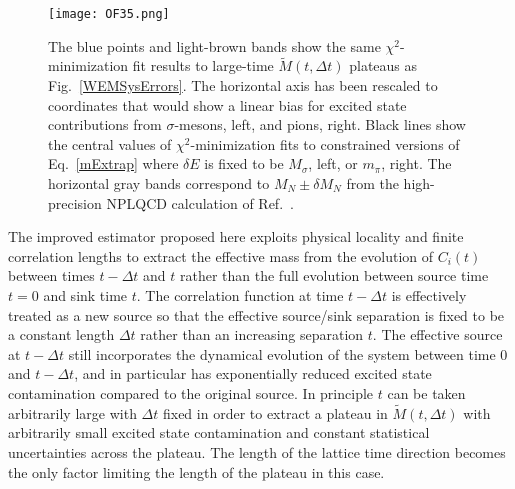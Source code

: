 %
\begin{figure}[!ht]
  \centering
  \texttt{[image: OF35.png]}
  \caption{
    The blue points and light-brown bands show the same $\chi^2$-minimization fit results to large-time $\tilde{M}(t,\Delta t)$ plateaus as Fig.~\ref{WEMSysErrors}.
    The horizontal axis has been rescaled to coordinates that would show a linear bias for excited state contributions from $\sigma$-mesons, left, and pions, right.
    Black lines show the central values of $\chi^2$-minimization fits to constrained versions of Eq.~\eqref{mExtrap} where $\delta E$ is fixed to be $M_\sigma$, left, or $m_\pi$, right.
    The horizontal gray bands correspond to $M_N \pm \delta M_N$ from the high-precision NPLQCD calculation of Ref.~\cite{Orginos:2015aya}.
 }
  \label{WEMSysErrors2}
\end{figure}
%



The improved estimator proposed here exploits physical locality and finite correlation lengths to extract the effective mass
 from the evolution of $C_i(t)$ between times $t - \Delta t$ and $t$ rather than the full evolution between source time $t=0$ and sink time $t$. 
 The correlation function at time $t - \Delta t$ is effectively treated as a new source so that the effective source/sink separation is fixed 
 to be a constant length $\Delta t$ rather than an increasing separation $t$. 
 The effective source at $t - \Delta t$ still incorporates the dynamical evolution of the system between time 0 and $t - \Delta t$, 
 and in particular has exponentially reduced excited state contamination compared to the original source. 
 In principle $t$ can be taken arbitrarily large with $\Delta t$ fixed in order to extract a plateau in $\tilde{M}(t, \Delta t)$ with 
 arbitrarily small excited state contamination and constant statistical uncertainties across the plateau. 
 The length of the lattice time direction becomes the only factor limiting the length of the plateau in this case.



